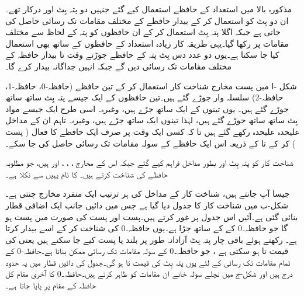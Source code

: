 مذکورہ بالا  میں   استعداد کے حافظے استعمال کیے گئے جنہیں دو پتہ بِٹ    اور   درکار تھے۔ان دو بِٹ کو استعمال کر کے بیدار حافظے کے مختلف مقامات تک رسائی حاصل کی جاتی ہے جبکہ اگلا پتہ بِٹ   استعمال کر کے ان حافظوں کو پتہ کے لحاظ سے مختلف مقامات پر رکھا گیا۔یہی طریقہ کار زیادہ استعداد کے حافظوں کے ساتھ بھی استعمال کیا جا سکتا ہے۔یوں دو عدد دس بِٹ پتہ  کے    حافظے  جوڑتے وقت   تا   بیدار حافظہ کے مختلف مقامات تک رسائی دیں گے جبکہ  انہیں جداگانہ بیدار کرے گا۔ 

شکل  -ا میں پست مخارج  شناخت کار استعمال  کر کے تین    حافظے (حافظہ-0، حافظہ-1، حافظہ-2)   سلسلہ وار جوڑے گئے ہیں۔تین حافظوں کے  ایک جیسے پتہ بِٹ  ساتھ ساتھ  جوڑے گئے ہیں۔ یوں تینوں  کے  ایک ساتھ جڑے ہیں، وغیرہ۔  اسی طرح  ایک جیسے  مواد بِٹ    ساتھ ساتھ جوڑے گئے ہیں، لہٰذا تینوں  ایک ساتھ جڑے ہیں، وغیرہ۔ تاہم  ان  کے  مداخل علیحدہ علیحدہ رکھے گئے ہیں تا کہ کسی ایک وقت پر صرف ایک حافظے کا  فعال ( پست ) کر کے   تا  کے ذریعہ    اس  ایک حافظے  کے سولہ مقامات تک  رسائی حاصل کی جا سکے۔

 شناخت کار کو پتہ  بِٹ   اور  بطور مداخل    فراہم  کیے گئے جبکہ اس کے مخارج ، ، ،  اور  ہیں، جو  مطلوبہ حافظے کی شناخت کرتے  ہیں۔ کا نام یہیں سے نکلا ہے۔


جیسا  آپ جانتے ہیں، شناخت کار کے مداخل کی  ہر ترتیب   ایک   منفرد مخارج چنتی ہے۔شکل-ب میں شناخت کار کا جدول دیا گیا ہے جس میں دائیں جانب ایک اضافی قطار بنائی گئی ہے۔آئیں اس جدول پر غور کرتے ہیں۔پست    اور پست   کی صورت میں   پست ہو گا جو حافظہ۔0 کے   کے ساتھ جڑا ہے۔یوں   حافظہ۔0 کی شناخت  کر کے اسے   بیدار کرتا  ہے۔  رکھتے ہوئے  باقی  چار پتہ بِٹ آزادانہ طور پر بلند یا پست کیے جا سکتے ہیں یعنی   کی قیمت   تا  ہو سکتی ہے ، جو حافظہ۔0 کے سولہ مقامات تک رسائی  ممکن بناتا ہے۔حافظہ-0 کے تمام مقامات تک رسائی کے لئے یوں پتہ بِٹ  کی قیمت   تا  ہو  گی۔جدول کی دائیں قطار میں یہ حدود درج ہیں اور شکل-ج میں نچلے سولہ خانے ان مقامات کو ظاہر کرتے ہیں۔حافظہ۔0 کا آخری مقام  کل حافظہ کے مقام  پر پایا جاتا ہے۔

